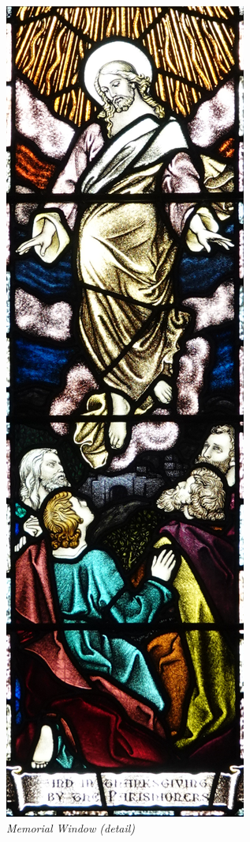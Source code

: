 \begin{figure}
\begin{center}
\includegraphics[width=.85\linewidth,center]{../images/memorialWindow.jpg}
\caption{\itshape Memorial Window (detail)}
\end{center}
\end{figure}




